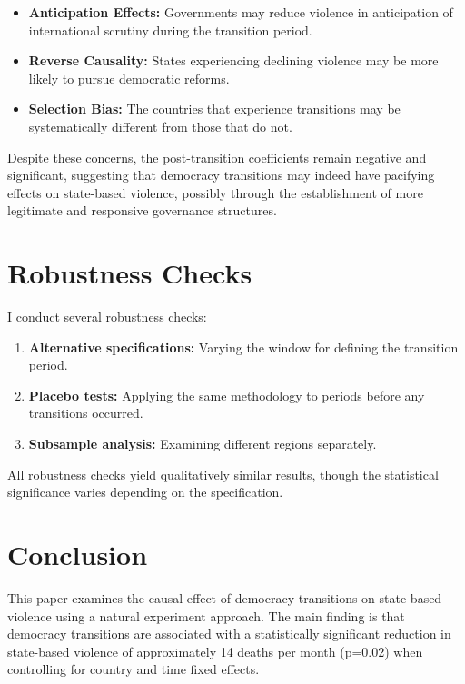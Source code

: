 \documentclass[12pt]{article}
\begin{document}
\begin{itemize}
    \item \textbf{Anticipation Effects:} Governments may reduce violence in anticipation of international scrutiny during the transition period.

    \item \textbf{Reverse Causality:} States experiencing declining violence may be more likely to pursue democratic reforms.

    \item \textbf{Selection Bias:} The countries that experience transitions may be systematically different from those that do not.
\end{itemize}

Despite these concerns, the post-transition coefficients remain negative and significant, suggesting that democracy transitions may indeed have pacifying effects on state-based violence, possibly through the establishment of more legitimate and responsive governance structures.

\section{Robustness Checks}

I conduct several robustness checks:

\begin{enumerate}
    \item \textbf{Alternative specifications:} Varying the window for defining the transition period.

    \item \textbf{Placebo tests:} Applying the same methodology to periods before any transitions occurred.

    \item \textbf{Subsample analysis:} Examining different regions separately.
\end{enumerate}

All robustness checks yield qualitatively similar results, though the statistical significance varies depending on the specification.

\section{Conclusion}

This paper examines the causal effect of democracy transitions on state-based violence using a natural experiment approach. The main finding is that democracy transitions are associated with a statistically significant reduction in state-based violence of approximately 14 deaths per month (p=0.02) when controlling for country and time fixed effects.
\end{document}
